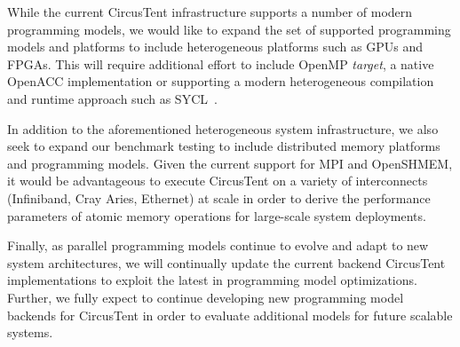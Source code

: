 
While the current CircusTent infrastructure supports a number of modern programming models, 
we would like to expand the set of supported programming models and platforms to include 
heterogeneous platforms such as GPUs and FPGAs.  This will require additional effort to include 
OpenMP \textit{target}, a native OpenACC implementation or supporting a modern heterogeneous compilation and runtime approach such as SYCL~\cite{10.1145/3204919.3204930}.  

In addition to the aforementioned heterogeneous system infrastructure, we also seek to expand our benchmark testing to include distributed memory platforms and programming models.  Given the current support for MPI and OpenSHMEM, it would be advantageous to execute CircusTent on a variety of interconnects (Infiniband, Cray Aries, Ethernet) at scale in order to derive the performance parameters of atomic memory operations for large-scale system deployments.   

Finally, as parallel programming models continue to evolve and adapt to new system architectures, we will continually update the current backend CircusTent implementations to exploit the latest in programming model optimizations.  Further, we fully expect to continue developing new programming model backends for CircusTent in order to evaluate additional models for future scalable systems.  
